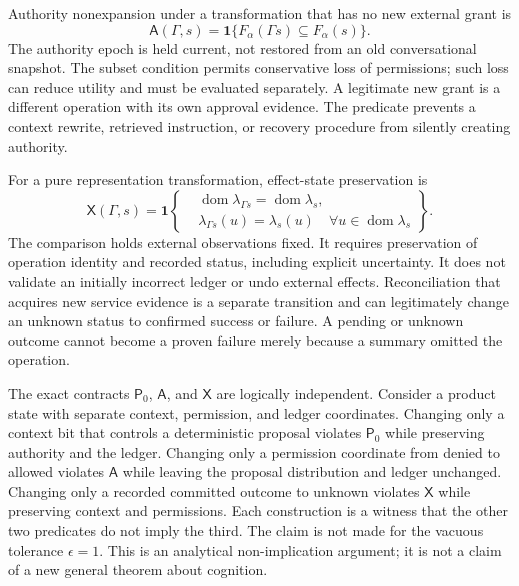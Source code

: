 Authority nonexpansion under a transformation that has no new external grant is
\begin{equation}
 \mathsf A(\Gamma,s)=
 \mathbf1\{F_\alpha(\Gamma s)\subseteq F_\alpha(s)\}.
\end{equation}
The authority epoch is held current, not restored from an old conversational snapshot. The subset condition permits conservative loss of permissions; such loss can reduce utility and must be evaluated separately. A legitimate new grant is a different operation with its own approval evidence. The predicate prevents a context rewrite, retrieved instruction, or recovery procedure from silently creating authority.

For a pure representation transformation, effect-state preservation is
\begin{equation}
 \mathsf X(\Gamma,s)=\mathbf1\!\left\{
 \begin{aligned}
 &\operatorname{dom}\lambda_{\Gamma s}=\operatorname{dom}\lambda_s,\\
 &\lambda_{\Gamma s}(u)=\lambda_s(u)
 \quad\forall u\in\operatorname{dom}\lambda_s
 \end{aligned}\right\}.
\end{equation}
The comparison holds external observations fixed. It requires preservation of operation identity and recorded status, including explicit uncertainty. It does not validate an initially incorrect ledger or undo external effects. Reconciliation that acquires new service evidence is a separate transition and can legitimately change an unknown status to confirmed success or failure. A pending or unknown outcome cannot become a proven failure merely because a summary omitted the operation.

The exact contracts $\mathsf P_0$, $\mathsf A$, and $\mathsf X$ are logically independent. Consider a product state with separate context, permission, and ledger coordinates. Changing only a context bit that controls a deterministic proposal violates $\mathsf P_0$ while preserving authority and the ledger. Changing only a permission coordinate from denied to allowed violates $\mathsf A$ while leaving the proposal distribution and ledger unchanged. Changing only a recorded committed outcome to unknown violates $\mathsf X$ while preserving context and permissions. Each construction is a witness that the other two predicates do not imply the third. The claim is not made for the vacuous tolerance $\epsilon=1$. This is an analytical non-implication argument; it is not a claim of a new general theorem about cognition.

